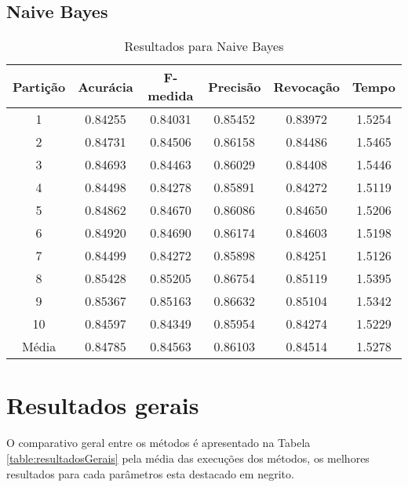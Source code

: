 \subsection{Naive Bayes}

\begin{table}[h]
\centering
\caption{Resultados para Naive Bayes}
\vspace{0.2cm}
\begin{tabular}{c|c|c|c|c|c}
Partição & Acurácia & F-medida & Precisão & Revocação & Tempo \\
\hline
1  & 0.84255 & 0.84031 & 0.85452 & 0.83972 & 1.5254 \\
2  & 0.84731 & 0.84506 & 0.86158 & 0.84486 & 1.5465 \\
3  & 0.84693 & 0.84463 & 0.86029 & 0.84408 & 1.5446 \\
4  & 0.84498 & 0.84278 & 0.85891 & 0.84272 & 1.5119 \\
5  & 0.84862 & 0.84670 & 0.86086 & 0.84650 & 1.5206 \\
6  & 0.84920 & 0.84690 & 0.86174 & 0.84603 & 1.5198 \\
7  & 0.84499 & 0.84272 & 0.85898 & 0.84251 & 1.5126 \\
8  & 0.85428 & 0.85205 & 0.86754 & 0.85119 & 1.5395 \\
9  & 0.85367 & 0.85163 & 0.86632 & 0.85104 & 1.5342 \\
10 & 0.84597 & 0.84349 & 0.85954 & 0.84274 & 1.5229 \\
\hline
Média & 0.84785 & 0.84563 & 0.86103 & 0.84514 & 1.5278 \\

\end{tabular} 
\label{table:resultadosNB}
\end{table}

\section{Resultados gerais}

O comparativo geral entre os métodos é apresentado na Tabela \ref{table:resultadosGerais} pela média das execuções dos métodos, os melhores resultados para cada parâmetros esta destacado em negrito.

